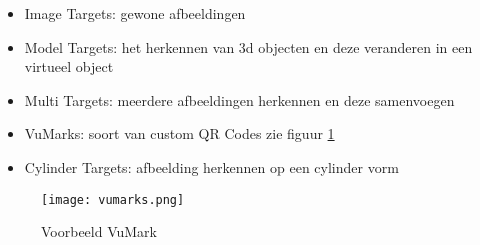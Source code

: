 \begin{itemize}
    \item Image Targets: gewone afbeeldingen
    \item Model Targets: het herkennen van 3d objecten en deze veranderen in een virtueel object
    \item Multi Targets: meerdere afbeeldingen herkennen en deze samenvoegen
    \item VuMarks: soort van custom QR Codes zie figuur \ref{fig:vumarks}
    \item Cylinder Targets: afbeelding herkennen op een cylinder vorm
\end{itemize} 

\begin{figure}
    \texttt{[image: vumarks.png]}
    \caption{Voorbeeld VuMark}
    \label{fig:vumarks}
\end{figure}

